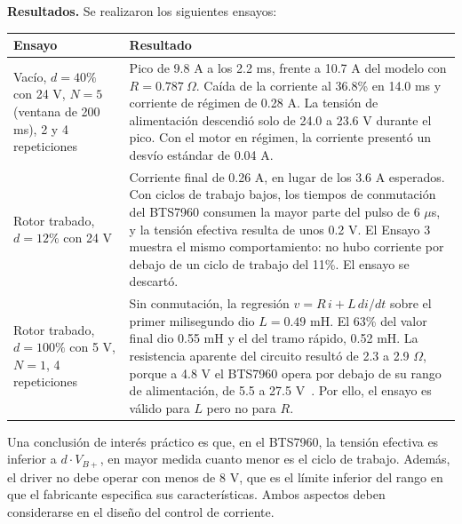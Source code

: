 \textbf{Resultados.} Se realizaron los siguientes ensayos:
\begin{center}
\begin{tabular}{p{}p{}}\toprule
Ensayo & Resultado\\\midrule
Vacío, $d = 40\%$ con 24 V, $N = 5$ (ventana de 200 ms), 2 y 4 repeticiones & Pico de 9.8 A a los 2.2 ms, frente a 10.7 A del modelo con $R = 0.787\ \Omega$. Caída de la corriente al 36.8\% en 14.0 ms y corriente de régimen de 0.28 A. La tensión de alimentación descendió solo de 24.0 a 23.6 V durante el pico. Con el motor en régimen, la corriente presentó un desvío estándar de 0.04 A.\\
Rotor trabado, $d = 12\%$ con 24 V & Corriente final de 0.26 A, en lugar de los 3.6 A esperados. Con ciclos de trabajo bajos, los tiempos de conmutación del BTS7960 consumen la mayor parte del pulso de 6 $\mu$s, y la tensión efectiva resulta de unos 0.2 V. El Ensayo 3 muestra el mismo comportamiento: no hubo corriente por debajo de un ciclo de trabajo del 11\%. El ensayo se descartó.\\
Rotor trabado, $d = 100\%$ con 5 V, $N = 1$, 4 repeticiones & Sin conmutación, la regresión $v = R\,i + L\,di/dt$ sobre el primer milisegundo dio $L = 0.49$ mH. El 63\% del valor final dio 0.55 mH y el del tramo rápido, 0.52 mH. La resistencia aparente del circuito resultó de 2.3 a 2.9 $\Omega$, porque a 4.8 V el BTS7960 opera por debajo de su rango de alimentación, de 5.5 a 27.5 V~\cite{bts7960}. Por ello, el ensayo es válido para $L$ pero no para $R$.\\\bottomrule
\end{tabular}
\end{center}

Una conclusión de interés práctico es que, en el BTS7960, la tensión efectiva es inferior a $d \cdot V_{B+}$, en mayor medida cuanto menor es el ciclo de trabajo. Además, el driver no debe operar con menos de 8 V, que es el límite inferior del rango en que el fabricante especifica sus características. Ambos aspectos deben considerarse en el diseño del control de corriente.

